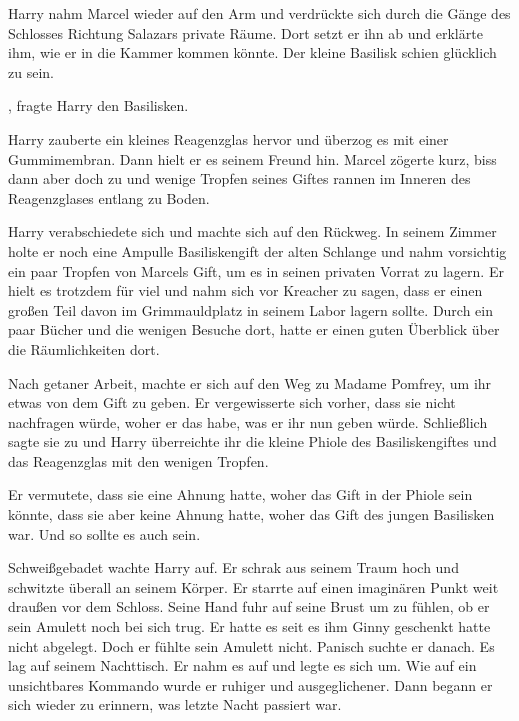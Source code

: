 Harry nahm Marcel wieder auf den Arm und verdrückte sich durch die Gänge des Schlosses Richtung Salazars private Räume. Dort setzt er ihn ab und erklärte ihm, wie er in die Kammer kommen könnte. Der kleine Basilisk schien glücklich zu sein.

, fragte Harry den Basilisken.




Harry zauberte ein kleines Reagenzglas hervor und überzog es mit einer Gummimembran. Dann hielt er es seinem Freund hin. Marcel zögerte kurz, biss dann aber doch zu und wenige Tropfen seines Giftes rannen im Inneren des Reagenzglases entlang zu Boden.



Harry verabschiedete sich und machte sich auf den Rückweg. In seinem Zimmer holte er noch eine Ampulle Basiliskengift der alten Schlange und nahm vorsichtig ein paar Tropfen von Marcels Gift, um es in seinen privaten Vorrat zu lagern. Er hielt es trotzdem für viel und nahm sich vor Kreacher zu sagen, dass er einen großen Teil davon im Grimmauldplatz in seinem Labor lagern sollte. Durch ein paar Bücher und die wenigen Besuche dort, hatte er einen guten Überblick über die Räumlichkeiten dort.

Nach getaner Arbeit, machte er sich auf den Weg zu Madame Pomfrey, um ihr etwas von dem Gift zu geben. Er vergewisserte sich vorher, dass sie nicht nachfragen würde, woher er das habe, was er ihr nun geben würde. Schließlich sagte sie zu und Harry überreichte ihr die kleine Phiole des Basiliskengiftes und das Reagenzglas mit den wenigen Tropfen.

Er vermutete, dass sie eine Ahnung hatte, woher das Gift in der Phiole sein könnte, dass sie aber keine Ahnung hatte, woher das Gift des jungen Basilisken war. Und so sollte es auch sein.

\trenn

Schweißgebadet wachte Harry auf. Er schrak aus seinem Traum hoch und schwitzte überall an seinem Körper. Er starrte auf einen imaginären Punkt weit draußen vor dem Schloss. Seine Hand fuhr auf seine Brust um zu fühlen, ob er sein Amulett noch bei sich trug. Er hatte es seit es ihm Ginny geschenkt hatte nicht abgelegt. Doch er fühlte sein Amulett nicht. Panisch suchte er danach. Es lag auf seinem Nachttisch. Er nahm es auf und legte es sich um. Wie auf ein unsichtbares Kommando wurde er ruhiger und ausgeglichener. Dann begann er sich wieder zu erinnern, was letzte Nacht passiert war.

